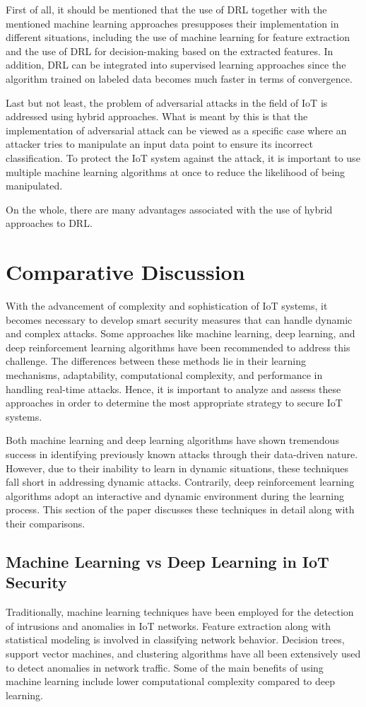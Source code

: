 \documentclass[12pt]{article}
\begin{document}
First of all, it should be mentioned that the use of DRL\cite{kheddar} together with the mentioned machine learning approaches presupposes their implementation in different situations, including the use of machine learning for feature extraction and the use of DRL for decision-making based on the extracted features. In addition, DRL can be integrated into supervised learning approaches since the algorithm trained on labeled data becomes much faster in terms of convergence.

Last but not least, the problem of adversarial attacks in the field of IoT is addressed using hybrid approaches. What is meant by this is that the implementation of adversarial attack can be viewed as a specific case where an attacker tries to manipulate an input data point to ensure its incorrect classification. To protect the IoT system against the attack, it is important to use multiple machine learning algorithms at once to reduce the likelihood of being manipulated.

On the whole, there are many advantages associated with the use of hybrid approaches to DRL.

	\section{Comparative Discussion}
	With the advancement of complexity and sophistication of IoT systems, it becomes necessary to develop smart security measures that can handle dynamic and complex attacks. Some approaches like machine learning, deep learning, and deep reinforcement learning algorithms have been recommended to address this challenge. The differences between these methods lie in their learning mechanisms, adaptability, computational complexity, and performance in handling real-time attacks. Hence, it is important to analyze and assess these approaches in order to determine the most appropriate strategy to secure IoT systems.

Both machine learning and deep learning algorithms have shown tremendous success in identifying previously known attacks through their data-driven nature. However, due to their inability to learn in dynamic situations, these techniques fall short in addressing dynamic attacks. Contrarily, deep reinforcement learning algorithms adopt an interactive and dynamic environment during the learning process. This section of the paper discusses these techniques in detail along with their comparisons.
\subsection{Machine Learning vs Deep Learning in IoT Security}
Traditionally, machine learning\cite{bommana} techniques have been employed for the detection of intrusions and anomalies in IoT networks. Feature extraction along with statistical modeling is involved in classifying network behavior. Decision trees, support vector machines, and clustering algorithms have all been extensively used to detect anomalies in network traffic. Some of the main benefits of using machine learning include lower computational complexity compared to deep learning.
\end{document}
